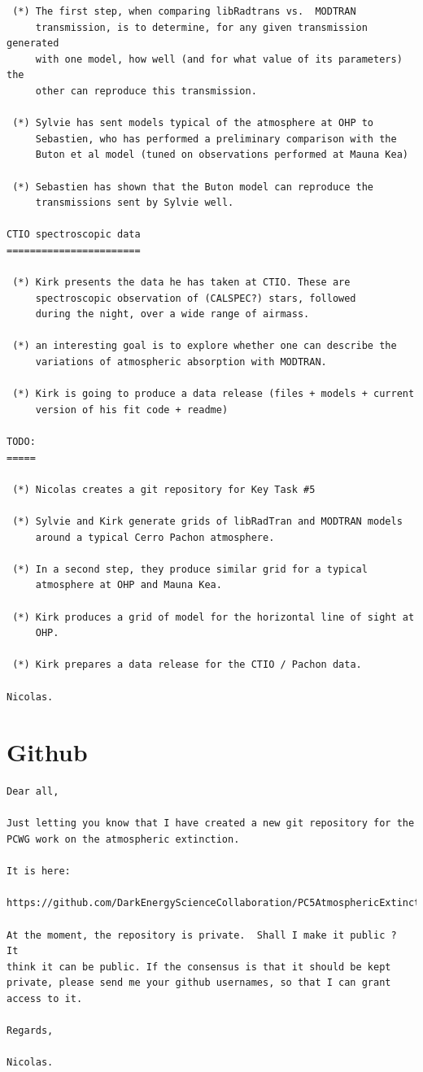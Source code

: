 \documentclass[a4paper]{article}
\begin{document}
\begin{verbatim}
 (*) The first step, when comparing libRadtrans vs.  MODTRAN
     transmission, is to determine, for any given transmission generated
     with one model, how well (and for what value of its parameters) the
     other can reproduce this transmission.

 (*) Sylvie has sent models typical of the atmosphere at OHP to
     Sebastien, who has performed a preliminary comparison with the
     Buton et al model (tuned on observations performed at Mauna Kea)

 (*) Sebastien has shown that the Buton model can reproduce the
     transmissions sent by Sylvie well. 

CTIO spectroscopic data
=======================

 (*) Kirk presents the data he has taken at CTIO. These are
     spectroscopic observation of (CALSPEC?) stars, followed 
     during the night, over a wide range of airmass.

 (*) an interesting goal is to explore whether one can describe the
     variations of atmospheric absorption with MODTRAN.

 (*) Kirk is going to produce a data release (files + models + current
     version of his fit code + readme)

TODO:
=====

 (*) Nicolas creates a git repository for Key Task #5

 (*) Sylvie and Kirk generate grids of libRadTran and MODTRAN models
     around a typical Cerro Pachon atmosphere.

 (*) In a second step, they produce similar grid for a typical
     atmosphere at OHP and Mauna Kea.

 (*) Kirk produces a grid of model for the horizontal line of sight at
     OHP.

 (*) Kirk prepares a data release for the CTIO / Pachon data.

Nicolas.
\end{verbatim}

\section*{Github}
\begin{verbatim}
Dear all, 

Just letting you know that I have created a new git repository for the
PCWG work on the atmospheric extinction. 

It is here:

https://github.com/DarkEnergyScienceCollaboration/PC5AtmosphericExtinction

At the moment, the repository is private.  Shall I make it public ?  It
think it can be public. If the consensus is that it should be kept
private, please send me your github usernames, so that I can grant
access to it.

Regards, 

Nicolas.
\end{verbatim}
\end{document}
